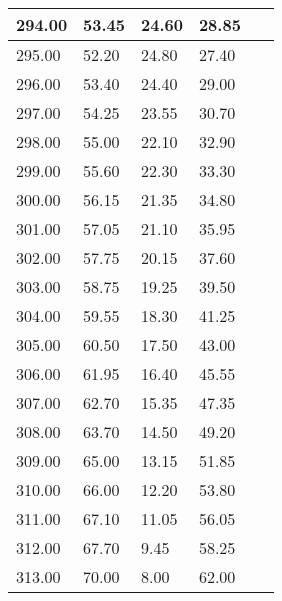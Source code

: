 \begin{table}[!ht]
  \centering
  \begin{tabular}{|l|l|l|l|l|}
  \hline
      294.00 & 53.45 & 24.60 & 28.85 & ~ \\ \hline
      295.00 & 52.20 & 24.80 & 27.40 & ~ \\ \hline
      296.00 & 53.40 & 24.40 & 29.00 & ~ \\ \hline
      297.00 & 54.25 & 23.55 & 30.70 & ~ \\ \hline
      298.00 & 55.00 & 22.10 & 32.90 & ~ \\ \hline
      299.00 & 55.60 & 22.30 & 33.30 & ~ \\ \hline
      300.00 & 56.15 & 21.35 & 34.80 & ~ \\ \hline
      301.00 & 57.05 & 21.10 & 35.95 & ~ \\ \hline
      302.00 & 57.75 & 20.15 & 37.60 & ~ \\ \hline
      303.00 & 58.75 & 19.25 & 39.50 & ~ \\ \hline
      304.00 & 59.55 & 18.30 & 41.25 & ~ \\ \hline
      305.00 & 60.50 & 17.50 & 43.00 & ~ \\ \hline
      306.00 & 61.95 & 16.40 & 45.55 & ~ \\ \hline
      307.00 & 62.70 & 15.35 & 47.35 & ~ \\ \hline
      308.00 & 63.70 & 14.50 & 49.20 & ~ \\ \hline
      309.00 & 65.00 & 13.15 & 51.85 & ~ \\ \hline
      310.00 & 66.00 & 12.20 & 53.80 & ~ \\ \hline
      311.00 & 67.10 & 11.05 & 56.05 & ~ \\ \hline
      312.00 & 67.70 & 9.45 & 58.25 & ~ \\ \hline
      313.00 & 70.00 & 8.00 & 62.00 & ~ \\ \hline
  \end{tabular}
\end{table}